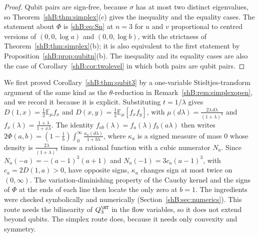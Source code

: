 \begin{proof}
Qubit pairs are sign-free, because $\sigma$ has at most two distinct eigenvalues, so Theorem~\ref{shB:thm:simplex}(c) gives the inequality and the equality cases. The statement about $\Phi$ is \eqref{shB:eq:Sn} at $n=3$ for $u$ and $v$ proportional to centred versions of $(0,0,\log a)$ and $(0,0,\log b)$, with the strictness of Theorem~\ref{shB:thm:simplex}(b); it is also equivalent to the first statement by Proposition~\ref{shB:prop:qubitn}(b). The inequality and its equality cases are also the case of Corollary~\ref{shB:cor:twolevel} in which both pairs are qubit pairs.
\end{proof}

We first proved Corollary~\ref{shB:thm:qubit3} by a one-variable Stieltjes-transform argument of the same kind as the $\theta$-reduction in Remark~\ref{shB:rem:simplexopen}, and we record it because it is explicit. Substituting $t=1/\lambda$ gives $D(1,x)=\frac12\mathbb E_\mu f_x$ and $D(x,y)=\frac12\mathbb E_\mu[f_xf_y]$, with $\mu(d\lambda)=\frac{2\lambda\,d\lambda}{(1+\lambda)^3}$ and $f_x(\lambda)=\frac{1+\lambda}{1+x\lambda}$. The identity $f_{ab}(\lambda)=f_a(\lambda)f_b(a\lambda)$ then writes $2\Phi(a,b)=(1-\frac1b)\int_0^\infty\frac{\kappa_a(d\lambda)}{1+b\lambda}$, where $\kappa_a$ is a signed measure of mass $0$ whose density is $\frac{2\lambda}{(1+\lambda)^3}$ times a rational function with a cubic numerator $N_a$. Since $N_a(-a)=-(a-1)^3(a+1)$ and $N_a(-1)=3c_a(a-1)^3$, with $c_a=2D(1,a)>0$, have opposite signs, $\kappa_a$ changes sign at most twice on $(0,\infty)$. The variation-diminishing property of the Cauchy kernel \cite[Ch.~5, Thm.~3.1]{Karlin1968} and the signs of $\Phi$ at the ends of each line then locate the only zero at $b=1$. The ingredients were checked symbolically and numerically (Section~\ref{shB:sec:numerics}). This route needs the bilinearity of $Q^\HT_3$ in the flow variables, so it does not extend beyond qubits. The simplex route does, because it needs only convexity and symmetry.

